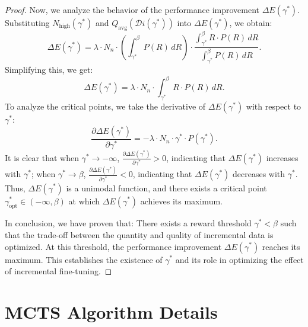 \documentclass{article}
\theoremstyle{plain}
\theoremstyle{definition}
\theoremstyle{remark}
\begin{document}
\begin{proof}
Now, we analyze the behavior of the performance improvement $\Delta E(\gamma^*)$. Substituting $N_{\text{high}}(\gamma^*)$ and $Q_{\text{avg}}(\mathcal{D}i(\gamma^*))$ into $\Delta E(\gamma^*)$, we obtain:
\begin{equation}
\Delta E(\gamma^*) = \lambda \cdot N_n \cdot \left(\int_{\gamma^*}^{\beta} P(R) \, dR\right) \cdot \frac{\int_{\gamma^*}^{\beta} R \cdot P(R) \, dR}{\int_{\gamma^*}^{\beta} P(R) \, dR}.
\end{equation}
Simplifying this, we get:
\begin{equation}
\Delta E(\gamma^*) = \lambda \cdot N_n \cdot \int_{\gamma^*}^{\beta} R \cdot P(R) \, dR.
\end{equation}
To analyze the critical points, we take the derivative of $\Delta E(\gamma^*)$ with respect to $\gamma^*$:
\begin{equation}
\frac{\partial \Delta E(\gamma^*)}{\partial \gamma^*} = -\lambda \cdot N_n \cdot \gamma^* \cdot P(\gamma^*).
\end{equation}
It is clear that when $\gamma^* \to -\infty$, $\frac{\partial \Delta E(\gamma^*)}{\partial \gamma^*} > 0$, indicating that $\Delta E(\gamma^*)$ increases with $\gamma^*$; when $\gamma^* \to \beta$, $\frac{\partial \Delta E(\gamma^*)}{\partial \gamma^*} < 0$, indicating that $\Delta E(\gamma^*)$ decreases with $\gamma^*$.
Thus, $\Delta E(\gamma^*)$ is a unimodal function, and there exists a critical point $\gamma^*_{\text{opt}} \in (-\infty, \beta)$ at which $\Delta E(\gamma^*)$ achieves its maximum.

In conclusion, we have proven that: There exists a reward threshold $\gamma^*<\beta$ such that the trade-off between the quantity and quality of incremental data is optimized. 
At this threshold, the performance improvement $\Delta E(\gamma^*)$ reaches its maximum.
This establishes the existence of $\gamma^*$ and its role in optimizing the effect of incremental fine-tuning.

\end{proof}





\section{MCTS Algorithm Details}
\label{implement}
\end{document}
